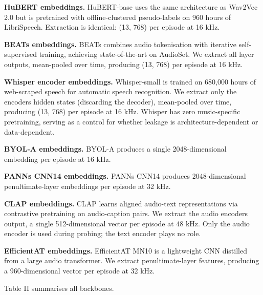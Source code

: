 \documentclass[conference]{IEEEtran}
\begin{document}
\textbf{HuBERT embeddings.} HuBERT-base \citep{hsu2021hubert} uses the
same architecture as Wav2Vec 2.0 but is pretrained with
offline-clustered pseudo-labels on 960 hours of LibriSpeech. Extraction
is identical: (13, 768) per episode at 16 kHz.

\textbf{BEATs embeddings.} BEATs \citep{chen2023beats} combines audio
tokenisation with iterative self-supervised training, achieving
state-of-the-art on AudioSet. We extract all layer outputs, mean-pooled
over time, producing (13, 768) per episode at 16 kHz.

\textbf{Whisper encoder embeddings.} Whisper-small
\citep{radford2023whisper} is trained on 680,000 hours of web-scraped
speech for automatic speech recognition. We extract only the
encoder\textquotesingle s hidden states (discarding the decoder),
mean-pooled over time, producing (13, 768) per episode at 16 kHz.
Whisper has zero music-specific pretraining, serving as a control for
whether leakage is architecture-dependent or data-dependent.

\textbf{BYOL-A embeddings.} BYOL-A \citep{niizumi2023byola} produces a
single 2048-dimensional embedding per episode at 16 kHz.

\textbf{PANNs CNN14 embeddings.} PANNs CNN14 \citep{kong2020panns}
produces 2048-dimensional penultimate-layer embeddings per episode at 32
kHz.

\textbf{CLAP embeddings.} CLAP \citep{wu2023clap} learns aligned
audio-text representations via contrastive pretraining on audio-caption
pairs. We extract the audio encoder\textquotesingle s output, a single
512-dimensional vector per episode at 48 kHz. Only the audio encoder is
used during probing; the text encoder plays no role.

\textbf{EfficientAT embeddings.} EfficientAT MN10
\citep{schmid2023efficientat} is a lightweight CNN distilled from a
large audio transformer. We extract penultimate-layer features,
producing a 960-dimensional vector per episode at 32 kHz.

Table II summarises all backbones.
\end{document}
